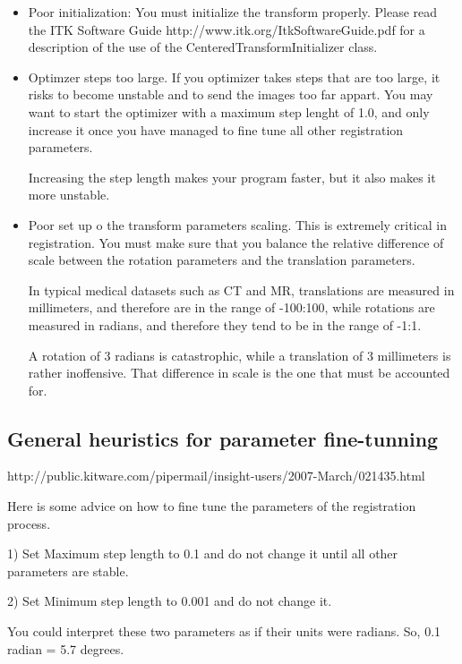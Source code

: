 \begin{itemize}
\item Poor initialization:    You must initialize the transform properly.
Please read the ITK Software Guide http://www.itk.org/ItkSoftwareGuide.pdf  for
a description of the use of the CenteredTransformInitializer class.
\item Optimzer steps too large. If you optimizer takes steps that are too
large, it risks to become unstable and to send the images too far appart.  You
may want to start the optimizer with a maximum step lenght of 1.0, and only
increase it once you have managed to fine tune all other registration
parameters.

Increasing the step length makes your program faster, but it also makes it more
unstable.



\item Poor set up o the transform parameters scaling.  This is extremely
critical in registration. You must make sure that you balance the relative
difference of scale between the rotation parameters and the translation
parameters.

In typical medical datasets such as CT and MR, translations are measured in
millimeters, and therefore are in the range of -100:100, while rotations are
measured in radians, and therefore they tend to be in the range of   -1:1.


A rotation of 3 radians is catastrophic, while a translation of 3 millimeters
is rather inoffensive.  That difference in scale is the one that must be
accounted for.
\end{itemize}



\subsection{General heuristics for parameter fine-tunning}





http://public.kitware.com/pipermail/insight-users/2007-March/021435.html

Here is some advice on how to fine tune the parameters
of the registration process.


1) Set Maximum step length to 0.1 and do not change it
   until all other parameters are stable.

2) Set Minimum step length to 0.001 and do not change it.

   You could interpret these two parameters as if their
   units were radians. So, 0.1 radian = 5.7 degrees.


